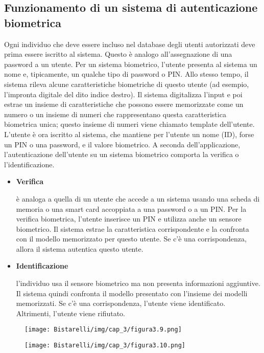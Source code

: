 \subsection{Funzionamento di un sistema di autenticazione biometrica}
Ogni individuo che deve essere incluso nel database degli utenti autorizzati deve prima essere iscritto al sistema. Questo è analogo all'assegnazione di una password a un utente. Per un sistema biometrico, l'utente presenta al sistema un nome e, tipicamente, un qualche tipo di password o PIN. Allo stesso tempo, il sistema rileva alcune caratteristiche biometriche di questo utente (ad esempio, l'impronta digitale del dito indice destro). Il sistema digitalizza l'input e poi estrae un insieme di caratteristiche che possono essere memorizzate come un numero o un insieme di numeri che rappresentano questa caratteristica biometrica unica; questo insieme di numeri viene chiamato template dell'utente. L'utente è ora iscritto al sistema, che mantiene per l'utente un nome (ID), forse un PIN o una password, e il valore biometrico.
\singlespacing
A seconda dell'applicazione, l'autenticazione dell'utente su un sistema biometrico comporta la verifica o l'identificazione.
\begin{itemize}
    \item \textbf{Verifica}
    
    è analoga a quella di un utente che accede a un sistema usando una scheda di memoria o una smart card accoppiata a una password o a un PIN. Per la verifica biometrica, l'utente inserisce un PIN e utilizza anche un sensore biometrico. Il sistema estrae la caratteristica corrispondente e la confronta con il modello memorizzato per questo utente. Se c'è una corrispondenza, allora il sistema autentica questo utente.
    
    \item \textbf{Identificazione}
    
    l'individuo usa il sensore biometrico ma non presenta informazioni aggiuntive. Il sistema quindi confronta il modello presentato con l'insieme dei modelli memorizzati. Se c'è una corrispondenza, l'utente viene identificato. Altrimenti, l'utente viene rifiutato.
\end{itemize}

\begin{figure}[H]
	\centering
    \texttt{[image: Bistarelli/img/cap\_3/figura3.9.png]}
\end{figure}

\begin{figure}[H]
	\centering
    \texttt{[image: Bistarelli/img/cap\_3/figura3.10.png]}
\end{figure}
